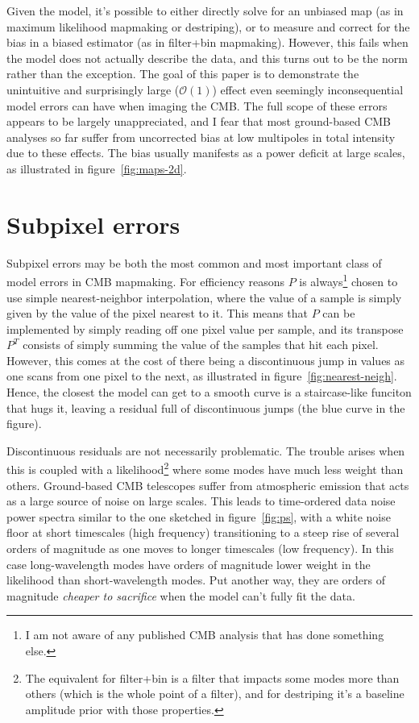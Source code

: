 \documentclass[twocolumn,apj]{aastex63}
\begin{document}
Given the model, it's possible to either directly solve for
an unbiased map (as in maximum likelihood mapmaking or destriping),
or to measure and correct for the bias in a biased estimator
(as in filter+bin mapmaking). However, this fails when the model
does not actually describe the data, and this turns out to be
the norm rather than the exception. The goal of this paper is to
demonstrate the unintuitive and surprisingly large ($\mathcal{O}(1)$) effect
even seemingly inconsequential model errors can have when imaging
the CMB. The full scope of these errors appears to be largely
unappreciated, and I fear that most ground-based CMB analyses
so far suffer from uncorrected bias at low multipoles in total intensity
due to these effects. The bias usually manifests as a power
deficit at large scales, as illustrated in figure~\ref{fig:maps-2d}.

\section{Subpixel errors}
Subpixel errors may be both the most common and most important
class of model errors in CMB mapmaking.
For efficiency reasons $P$ is always\footnote{I am not aware of any
published CMB analysis that has done something else.}
chosen to use simple nearest-neighbor interpolation, where the
value of a sample is simply given by the value of the pixel nearest
to it. This means that $P$ can be implemented by simply reading off
one pixel value per sample, and its transpose $P^T$ consists of simply
summing the value of the samples that hit each pixel. However, this
comes at the cost of there being a discontinuous jump in values as one
scans from one pixel to the next, as illustrated in figure~\ref{fig:nearest-neigh}.
Hence, the closest the model can get to a smooth curve is a
staircase-like funciton that hugs it, leaving a residual full of
discontinuous jumps (the blue curve in the figure).

Discontinuous residuals are not necessarily problematic. The trouble arises
when this is coupled with a likelihood\footnote{The equivalent for filter+bin is a filter that
impacts some modes more than others (which is the whole point of a filter),
and for destriping it's a baseline amplitude prior with those properties.
} where some modes have much less weight than others. Ground-based CMB
telescopes suffer from atmospheric emission that acts as a large source
of noise on large scales. This leads to time-ordered data noise power
spectra similar to the one sketched in figure~\ref{fig:ps}, with
a white noise floor at short timescales (high frequency) transitioning to a steep
rise of several orders of magnitude as one moves to longer timescales
(low frequency). In this case long-wavelength modes have orders of magnitude
lower weight in the likelihood than short-wavelength modes. Put another way,
they are orders of magnitude \emph{cheaper to sacrifice} when the model can't fully
fit the data.
\end{document}

